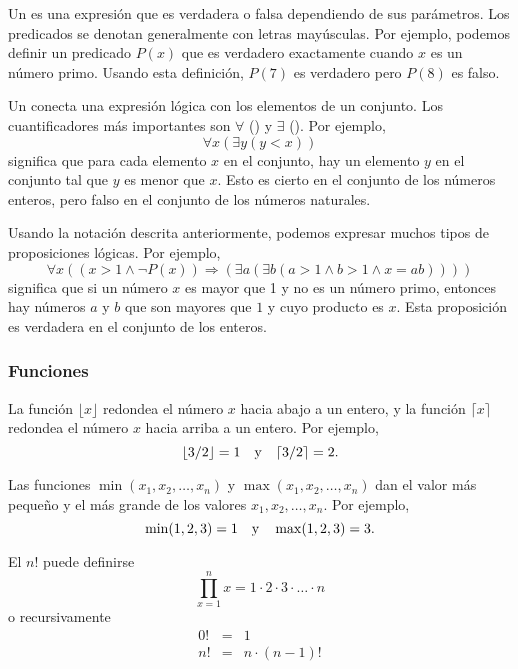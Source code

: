 
Un  es una expresión que es verdadera o falsa
dependiendo de sus parámetros.
Los predicados se denotan generalmente con letras mayúsculas.
Por ejemplo, podemos definir un predicado $P(x)$
que es verdadero exactamente cuando $x$ es un número primo.
Usando esta definición, $P(7)$ es verdadero pero $P(8)$ es falso.


Un  conecta una expresión lógica
con los elementos de un conjunto.
Los cuantificadores más importantes son
$\forall$ () y $\exists$ ().
Por ejemplo,
\[\forall x (\exists y (y < x))\]
significa que para cada elemento $x$ en el conjunto,
hay un elemento $y$ en el conjunto
tal que $y$ es menor que $x$.
Esto es cierto en el conjunto de los números enteros,
pero falso en el conjunto de los números naturales.

Usando la notación descrita anteriormente,
podemos expresar muchos tipos de proposiciones lógicas.
Por ejemplo,
\[\forall x ((x>1 \land \lnot P(x)) \Rightarrow (\exists a (\exists b (a > 1 \land b > 1 \land x = ab))))\]
significa que si un número $x$ es mayor que 1
y no es un número primo,
entonces hay números $a$ y $b$
que son mayores que $1$ y cuyo producto es $x$.
Esta proposición es verdadera en el conjunto de los enteros.

\subsubsection{Funciones}

La función $\lfloor x \rfloor$ redondea el número $x$
hacia abajo a un entero, y la función
$\lceil x \rceil$ redondea el número $x$
hacia arriba a un entero. Por ejemplo,
\[ \lfloor 3/2 \rfloor = 1 \hspace{10px} \textrm{y} \hspace{10px} \lceil 3/2 \rceil = 2.\]

Las funciones $\min(x_1,x_2,\ldots,x_n)$
y $\max(x_1,x_2,\ldots,x_n)$
dan el valor más pequeño y el más grande de los valores
$x_1,x_2,\ldots,x_n$.
Por ejemplo,
\[ \min(1,2,3)=1 \hspace{10px} \textrm{y} \hspace{10px} \max(1,2,3)=3.\]


El  $n!$ puede definirse
\[\prod_{x=1}^n x = 1 \cdot 2 \cdot 3 \cdot \ldots \cdot n\]
o recursivamente
\[
    \begin{array}{lcl}
        0! & = & 1              \\
        n! & = & n \cdot (n-1)! \\
    \end{array}
\]

